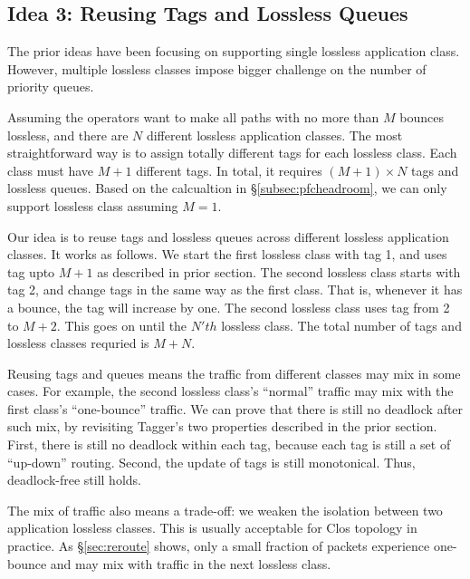 

\subsection{Idea 3: Reusing Tags and Lossless Queues}\label{subsec:reusing}

The prior ideas have been focusing on supporting single lossless application class. 
However, multiple lossless classes impose bigger challenge on the number of priority queues.

Assuming the operators want to make all paths with no more than $M$ bounces lossless, 
and there are $N$ different lossless application classes. The most straightforward
way is to assign totally different tags for each lossless class. Each class must have 
$M+1$ different tags. In total, it requires $(M+1) \times N$ tags and lossless queues.
Based on the calcualtion in \S\ref{subsec:pfcheadroom}, we can only support 
lossless class assuming $M=1$.

Our idea is to reuse tags and lossless queues across different lossless application classes.
It works as follows. We start the first lossless class with tag 1, and uses tag upto $M+1$
as described in prior section.
The second lossless class starts with tag 2, and change tags in the same way as the first class.
That is, whenever it has a bounce, the tag will increase by one. The second lossless class
uses tag from 2 to $M+2$. This goes on until the $N'th$ lossless class. The total number of tags
and lossless classes requried is $M + N$.

Reusing tags and queues means the traffic from different classes may mix in some cases.
For example, the second lossless class's ``normal'' traffic may mix with the first 
class's ``one-bounce'' traffic.
We can prove that there is still no deadlock after such mix, by revisiting Tagger's two
properties described in the prior section. First, there is still no deadlock within each tag, 
because each tag is still a set of ``up-down'' routing. Second, the update of tags is still
monotonical. Thus, deadlock-free still holds.

 The mix of traffic also means a trade-off: we weaken the isolation between two application 
lossless classes. This is usually acceptable for Clos topology in practice. As \S\ref{sec:reroute}
shows, only a small fraction of packets experience one-bounce and may mix with traffic
in the next lossless class.

